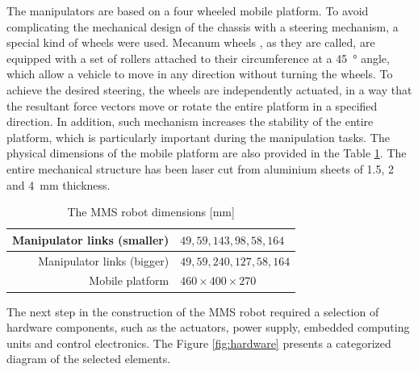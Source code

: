 The manipulators are based on a four wheeled mobile platform. To avoid complicating the mechanical design of the chassis with a steering mechanism, a special kind of wheels were used. Mecanum wheels \cite{wikipedia}, as they are called, are equipped with a set of rollers attached to their circumference at a \SI{45}{\degree} angle, which allow a vehicle to move in any direction without turning the wheels. To achieve the desired steering, the wheels are independently actuated, in a way that the resultant force vectors move or rotate the entire platform in a specified direction. In addition, such mechanism increases the stability of the entire platform, which is particularly important during the manipulation tasks. The physical dimensions of the mobile platform are also provided in the Table \ref{tab:dimensions}. The entire mechanical structure has been laser cut from aluminium sheets of \SI{1.5}{}, \SI{2}{} and \SI{4}{\milli\meter} thickness.

\begin{table}[H]

\begin{center}

\begin{tabular}{r||l}
\hline
Manipulator links  (smaller)    & $49,59,143,98,58,164$ \\

\hline
Manipulator links  (bigger)        & $49,59,240,127,58,164$ \\

\hline
Mobile platform & $460\times 400\times 270$ \\

\hline
\end{tabular}
\caption{The MMS robot dimensions [mm]}
\label{tab:dimensions}
\end{center}
\end{table}


The next step in the construction of the MMS robot required a selection of hardware components, such as the actuators, power supply, embedded computing units and control electronics. The Figure \ref{fig:hardware} presents a categorized diagram of the selected elements. 

